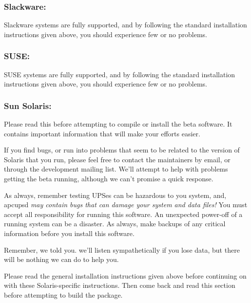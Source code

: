 \label{Slackware}

\subsubsection*{Slackware:}

\label{index-Slackware-46}
\label{index-OS_002c-Slackware-47}
Slackware systems are fully supported, and by following the standard
installation instructions given above, you should experience few or no
problems. 

\label{SUSE}

\subsubsection*{SUSE:}

\label{index-SuSE-48}
\label{index-OS_002c-SuSE-49}
SUSE systems are fully supported, and by following the standard installation
instructions given above, you should experience few or no problems. 

\label{Sun-Solaris}

\subsubsection*{Sun Solaris:}

\label{index-Sun-50}
\label{index-Solaris-51}
\label{index-OS_002c-Solaris-52}
Please read this before attempting to compile or install the beta software. It
contains important information that will make your efforts easier.  

If you find bugs, or run into problems that seem to be related to the version
of Solaris that you run, please feel free to contact the maintainers by email,
or through the development mailing list. We'll attempt to help with problems
getting the beta running, although we can't promise a quick response.  

As always, remember testing UPSes can be hazardous to you system, and, apcupsd
{\it may contain bugs that can damage your system and data files!} You must
accept all responsibility for running this software. An unexpected power-off
of a running system can be a disaster. As always, make backups of any critical
information before you install this software.  

Remember, we told you. we'll listen sympathetically if you lose data, but
there will be nothing we can do to help you.  

Please read the general installation instructions given above before
continuing on with these Solaris-specific instructions. Then come back and
read this section before attempting to build the package.  

